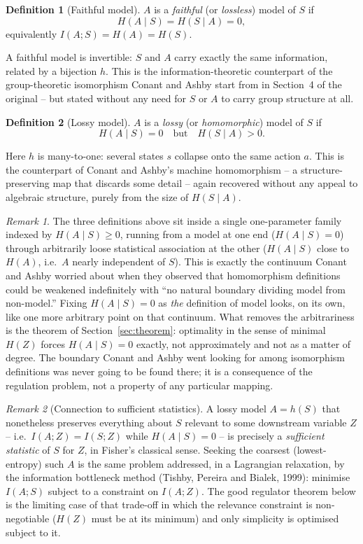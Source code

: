\documentclass[11pt]{article}
\theoremstyle{definition}
\newtheorem{definition}{Definition}
\theoremstyle{remark}
\newtheorem{remark}{Remark}
\begin{document}
\begin{definition}[Faithful model]
$A$ is a \emph{faithful} (or \emph{lossless}) model of $S$ if
\[
H(A\mid S) = H(S\mid A) = 0,
\]
equivalently $I(A;S) = H(A) = H(S)$.
\end{definition}

A faithful model is invertible: $S$ and $A$ carry exactly the same
information, related by a bijection $h$. This is the information-theoretic
counterpart of the group-theoretic isomorphism Conant and Ashby start from
in Section~4 of the original -- but stated without any need for $S$ or $A$
to carry group structure at all.

\begin{definition}[Lossy model]
\label{def:lossy}
$A$ is a \emph{lossy} (or \emph{homomorphic}) model of $S$ if
\[
H(A\mid S) = 0 \quad\text{but}\quad H(S\mid A) > 0.
\]
\end{definition}

Here $h$ is many-to-one: several states $s$ collapse onto the same action
$a$. This is the counterpart of Conant and Ashby's machine homomorphism --
a structure-preserving map that discards some detail -- again recovered
without any appeal to algebraic structure, purely from the size of
$H(S\mid A)$.

\begin{remark}
The three definitions above sit inside a single one-parameter family
indexed by $H(A\mid S)\ge 0$, running from a model at one end
($H(A\mid S)=0$) through arbitrarily loose statistical association at the
other ($H(A\mid S)$ close to $H(A)$, i.e.\ $A$ nearly independent of $S$).
This is exactly the continuum Conant and Ashby worried about when they
observed that homomorphism definitions could be weakened indefinitely with
``no natural boundary dividing model from non-model.'' Fixing $H(A\mid
S)=0$ as \emph{the} definition of model looks, on its own, like one more
arbitrary point on that continuum. What removes the arbitrariness is the
theorem of Section~\ref{sec:theorem}: optimality in the sense of minimal
$H(Z)$ forces $H(A\mid S)=0$ exactly, not approximately and not as a matter
of degree. The boundary Conant and Ashby went looking for among
isomorphism definitions was never going to be found there; it is a
consequence of the regulation problem, not a property of any particular
mapping.
\end{remark}

\begin{remark}[Connection to sufficient statistics]
A lossy model $A=h(S)$ that nonetheless preserves everything about $S$
relevant to some downstream variable $Z$ -- i.e.\ $I(A;Z)=I(S;Z)$ while
$H(A\mid S)=0$ -- is precisely a \emph{sufficient statistic} of $S$ for
$Z$, in Fisher's classical sense. Seeking the coarsest (lowest-entropy)
such $A$ is the same problem addressed, in a Lagrangian relaxation, by the
information bottleneck method (Tishby, Pereira and Bialek, 1999): minimise
$I(A;S)$ subject to a constraint on $I(A;Z)$. The good regulator theorem
below is the limiting case of that trade-off in which the relevance
constraint is non-negotiable ($H(Z)$ must be at its minimum) and only
simplicity is optimised subject to it.
\end{remark}
\end{document}
